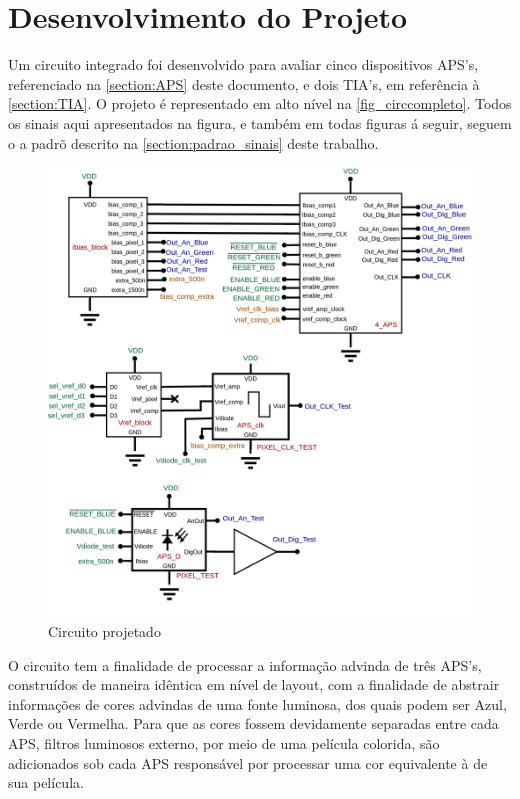 \chapter[Desenvolvimento do Projeto]{Desenvolvimento do Projeto}
\label{sec_circ_comp}

Um circuito integrado foi desenvolvido para avaliar cinco dispositivos APS's, referenciado na \autoref{section:APS} deste documento, e dois TIA's, em refer\^encia \`a \autoref{section:TIA}. O projeto \'e representado em alto n\'ivel na \autoref{fig_circcompleto}. Todos os sinais aqui apresentados na figura, e tamb\'em em todas figuras \'a seguir, seguem o a padr\~o descrito na \autoref{section:padrao_sinais} deste trabalho.

\begin{figure}[htb]
	\caption{\label{fig_circcompleto}Circuito projetado}
	\begin{center}
	    \includegraphics[width=\textwidth]{Circuitos/Complete_Circuit.png}
	\end{center}
\end{figure}

O circuito tem a finalidade de processar a informa{\c c}\~ao advinda de tr\^es APS's, constru\'idos de maneira id\^entica em n\'ivel de layout, com a finalidade de abstrair informa{\c c}\~oes de cores advindas de uma fonte luminosa, dos quais podem ser Azul, Verde ou Vermelha. Para que as cores fossem devidamente separadas entre cada APS, filtros luminosos externo, por meio de uma pel\'icula colorida, s\~ao adicionados sob cada APS respons\'avel por processar uma cor equivalente \`a de sua pel\'icula.

